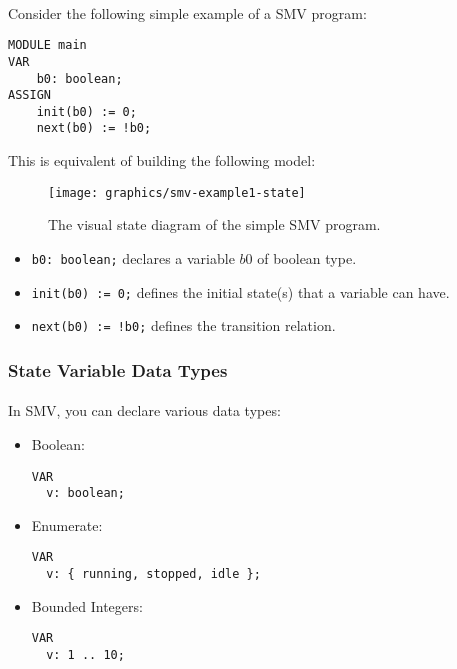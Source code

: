 \documentclass{article}
\theoremstyle{plain}
\theoremstyle{definition}
\begin{document}
\begin{multicols}{2}
\paragraph{} Consider the following simple example of a SMV program:

\begin{lstlisting}
MODULE main
VAR
	b0: boolean;
ASSIGN
	init(b0) := 0;
	next(b0) := !b0;
\end{lstlisting}

This is equivalent of building the following model:

\begin{figure}[H]
\centering
\texttt{[image: graphics/smv-example1-state]}
\caption{The visual state diagram of the simple SMV program.}
\end{figure}

\begin{itemize}
\item \lstinline{b0: boolean;} declares a variable $b0$ of boolean type.
\item \lstinline{init(b0) := 0;} defines the initial state(s) that a variable can have.
\item \lstinline{next(b0) := !b0;} defines the transition relation.
\end{itemize}

\subsubsection{State Variable Data Types}

\paragraph{} In SMV, you can declare various data types:

\begin{itemize}
\item Boolean: \begin{lstlisting}
VAR
  v: boolean;
\end{lstlisting}
\item Enumerate: \begin{lstlisting}
VAR
  v: { running, stopped, idle };
\end{lstlisting}
\item Bounded Integers: \begin{lstlisting}
VAR
  v: 1 .. 10;
\end{lstlisting}
\end{itemize}


\end{multicols}
\end{document}
